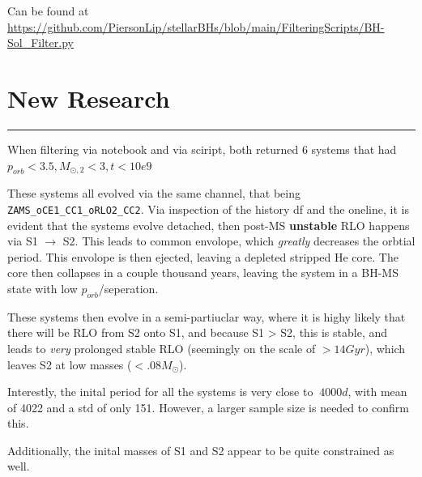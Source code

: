 \documentclass{article}
\theoremstyle{mytheoremstyle}
\theoremstyle{mytheoremstyle}
\theoremstyle{myproblemstyle}
\theoremstyle{myproblemstyle}
\newcounter{const}
\begin{document}
Can be found at \url{https://github.com/PiersonLip/stellarBHs/blob/main/FilteringScripts/BH-Sol_Filter.py}

\pagebreak
\section{New Research}
\hrule
\vspace{.5cm}
When filtering via notebook and via sciript, both returned 6 systems that had \(p_{orb} < 3.5, M_{\odot,2} < 3, t < 10e9\)

These systems all evolved via the same channel, that being \verb|ZAMS_oCE1_CC1_oRLO2_CC2|. Via inspection of the history df and the oneline, it is evident that the systems evolve detached, then post-MS \textbf{unstable} RLO happens via S1 \(\rightarrow\) S2. This leads to common envolope, which \textit{greatly} decreases the orbtial period. This envolope is then ejected, leaving a depleted stripped He core. The core then collapses in a couple thousand years, leaving the system in a BH-MS state with low \(p_{orb}\)/seperation. 

These systems then evolve in a semi-partiuclar way, where it is highy likely that there will be RLO from S2 onto S1, and because S1 > S2, this is stable, and leads to \textit{very} prolonged stable RLO (seemingly on the scale of  \(> 14 Gyr\)), which leaves S2 at low masses (\(< .08 M_\odot\)).

Interestly, the inital period for all the systems is very close to \(~4000 d\), with mean of 4022 and a std of only 151. However, a larger sample size is needed to confirm this.

Additionally, the inital masses of S1 and S2 appear to be quite constrained as well. 
\end{document}
